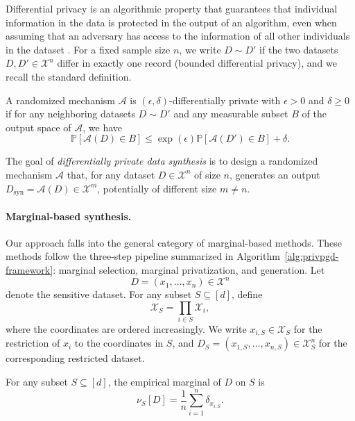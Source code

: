 Differential privacy is an algorithmic property that guarantees that individual information in the data is protected in the output of an algorithm, even when assuming that an adversary has access to the information of all other individuals in the dataset \citep{dp}. For a fixed sample size \(n\), we write \(D \sim D'\) if the two datasets \(D, D' \in \mathcal{X}^n\) differ in exactly one record (bounded differential privacy), and we recall the standard definition.

\begin{definition}
\label{def:privpgd-dp}
A randomized mechanism \(\mathcal{A}\) is \((\epsilon,\delta)\)-differentially private with \(\epsilon > 0\) and \(\delta \geq 0\) if for any neighboring datasets \(D \sim D'\) and any measurable subset \(B\) of the output space of \(\mathcal{A}\), we have
\[
  \mathbb{P}[\mathcal{A}(D)\in B]
  \leq
  \exp(\epsilon)\mathbb{P}[\mathcal{A}(D')\in B] + \delta.
\]
\end{definition}

The goal of \emph{differentially private data synthesis} is to design a randomized mechanism \(\mathcal{A}\) that, for any dataset \(D \in \mathcal{X}^n\) of size \(n\), generates an output \(D_{\mathrm{syn}} = \mathcal{A}(D) \in \mathcal{X}^m\), potentially of different size \(m \neq n\).

\paragraph{Marginal-based synthesis.}
Our approach falls into the general category of marginal-based methods. These methods follow the three-step pipeline summarized in Algorithm~\ref{alg:privpgd-framework}: marginal selection, marginal privatization, and generation. Let
\[
  D = (x_1,\dots,x_n) \in \mathcal{X}^n
\]
denote the sensitive dataset. For any subset \(S \subseteq [d]\), define
\[
  \mathcal{X}_S = \prod_{i \in S} \mathcal{X}_i,
\]
where the coordinates are ordered increasingly. We write \(x_{i,S} \in \mathcal{X}_S\) for the restriction of \(x_i\) to the coordinates in \(S\), and \(D_S = (x_{1,S},\dots,x_{n,S}) \in \mathcal{X}_S^n\) for the corresponding restricted dataset.

\begin{definition}
For any subset \(S \subseteq [d]\), the empirical marginal of \(D\) on \(S\) is
\[
  \nu_S[D] = \frac{1}{n}\sum_{i=1}^n \delta_{x_{i,S}}.
\]
\end{definition}

